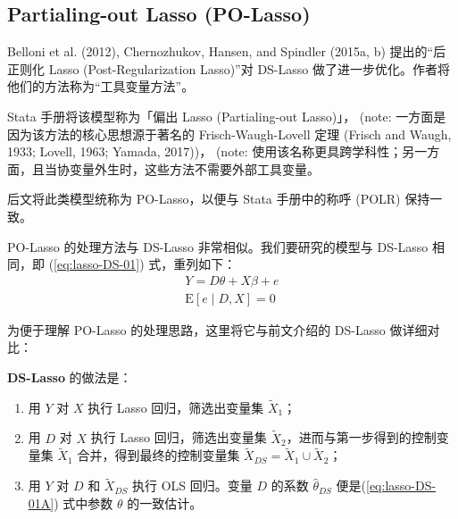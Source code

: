 \subsection{Partialing-out Lasso (PO-Lasso)}\label{sec:polasso}




Belloni et al. (2012), Chernozhukov, Hansen, and Spindler (2015a, b) 提出的“后正则化 Lasso (Post-Regularization Lasso)”对 DS-Lasso 做了进一步优化。作者将他们的方法称为“工具变量方法”。

Stata 手册将该模型称为「偏出 Lasso (Partialing-out Lasso)」， (note: %
一方面是因为该方法的核心思想源于著名的 Frisch-Waugh-Lovell 定理 (Frisch and  Waugh, 1933; Lovell, 1963; Yamada, 2017))， (note: %
使用该名称更具跨学科性；另一方面，且当协变量外生时，这些方法不需要外部工具变量。

后文将此类模型统称为 PO-Lasso，以便与 Stata 手册中的称呼 (POLR) 保持一致。 

PO-Lasso 的处理方法与 DS-Lasso 非常相似。我们要研究的模型与 DS-Lasso 相同，即 (\ref{eq:lasso-DS-01}) 式，重列如下：
\begin{equation}\label{eq:lasso-DS-01A}
\begin{aligned}%
Y =D \theta + X \beta + e \\
\mathrm{E}[e \mid D, X] =0
\end{aligned}
\end{equation}

为便于理解 PO-Lasso 的处理思路，这里将它与前文介绍的 DS-Lasso 做详细对比：


\textbf{DS-Lasso} 的做法是：

\begin{enumerate}
\item 用 $Y$ 对 $X$ 执行 Lasso 回归，筛选出变量集 $\widetilde{X}_1$；
\item 用 $D$ 对 $X$ 执行 Lasso 回归，筛选出变量集 $\widetilde{X}_2$，进而与第一步得到的控制变量集 $\widetilde{X}_1$ 合并，得到最终的控制变量集 $\widetilde{X}_{DS} = \widetilde{X}_1 \cup \widetilde{X}_2$；
\item 用 $Y$ 对 $D$ 和 $\widetilde{X}_{DS}$ 执行 OLS 回归。变量 $D$ 的系数 $\widehat{\theta}_{DS}$ 便是(\ref{eq:lasso-DS-01A}) 式中参数 $\theta$ 的一致估计。
\end{enumerate}



